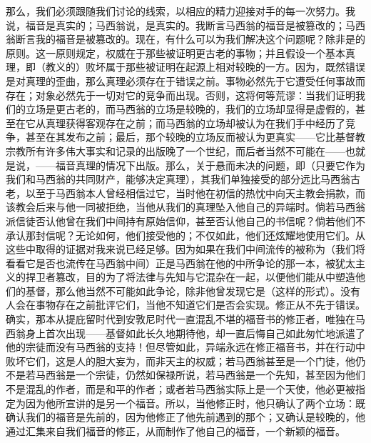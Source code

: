 那么，我们必须跟随我们讨论的线索，以相应的精力迎接对手的每一次努力。我说，福音是真实的；马西翁说，是真实的。我断言马西翁的福音是被篡改的；马西翁断言我的福音是被篡改的。现在，有什么可以为我们解决这个问题呢？除非是的原则。这一原则规定，权威在于那些被证明更古老的事物；并且假设一个基本真理，即（教义的）败坏属于那些被证明在起源上相对较晚的一方。因为，既然错误是对真理的歪曲，那么真理必须存在于错误之前。事物必然先于它遭受任何事故而存在；对象必然先于一切对它的竞争而出现。否则，这将何等荒谬：当我们证明我们的立场是更古老的，而马西翁的立场是较晚的，我们的立场却显得是虚假的，甚至在它从真理获得客观存在之前；而马西翁的立场却被认为在我们手中经历了竞争，甚至在其发布之前；最后，那个较晚的立场反而被认为更真实——它比基督教宗教所有许多伟大事实和记录的出版晚了一个世纪，而后者当然不可能在——也就是说，——福音真理的情况下出版。那么，关于悬而未决的问题，即（只要它作为我们和马西翁的共同财产，能够决定真理），其我们单独接受的部分远比马西翁古老，以至于马西翁本人曾经相信过它，当时他在初信的热忱中向天主教会捐款，而该教会后来与他一同被拒绝，当他从我们的真理坠入他自己的异端时。倘若马西翁派信徒否认他曾在我们中间持有原始信仰，甚至否认他自己的书信呢？倘若他们不承认那封信呢？无论如何，他们接受他的；不仅如此，他们还炫耀地使用它们。从这些中取得的证据对我来说已经足够。因为如果在我们中间流传的被称为（我们将看看它是否也流传在马西翁中间）正是马西翁在他的中所争论的那一本，被犹太主义的捍卫者篡改，目的为了将法律与先知与它混杂在一起，以便他们能从中塑造他们的基督，那么他当然不可能如此争论，除非他曾发现它是（这样的形式）。没有人会在事物存在之前批评它们，当他不知道它们是否会实现。修正从不先于错误。确实，那本从提庇留时代到安敦尼时代一直混乱不堪的福音书的修正者，唯独在马西翁身上首次出现——基督如此长久地期待他，却一直后悔自己如此匆忙地派遣了他的宗徒而没有马西翁的支持！但尽管如此，异端永远在修正福音书，并在行动中败坏它们，这是人的胆大妄为，而非天主的权威；若马西翁甚至是一个门徒，他仍不是若马西翁是一个宗徒，仍然如保禄所说，若马西翁是一个先知，甚至因为他们不是混乱的作者，而是和平的作者；或者若马西翁实际上是一个天使，他必更被指定为因为他所宣讲的是另一个福音。所以，当他修正时，他只确认了两个立场：既确认我们的福音是先前的，因为他修正了他先前遇到的那个；又确认是较晚的，他通过汇集来自我们福音的修正，从而制作了他自己的福音，一个新颖的福音。\par

